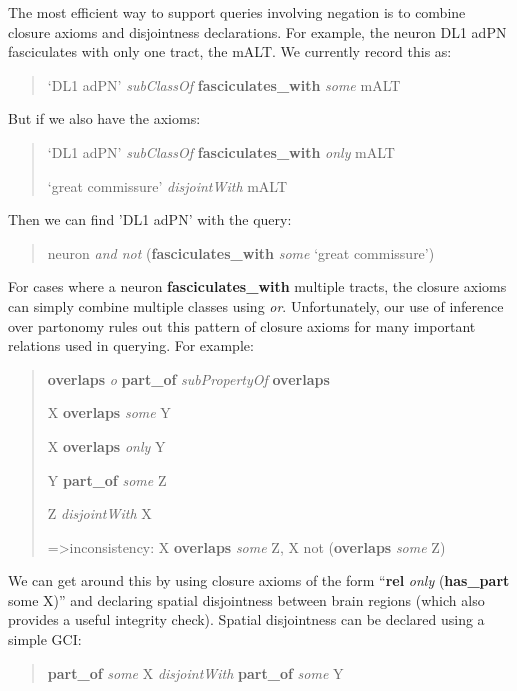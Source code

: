 \documentclass[runningheads,a4paper]{llncs}
\begin{document}
The most efficient way to support queries involving negation is to
combine closure axioms and disjointness declarations.  For
example, the neuron DL1 adPN fasciculates with only one tract, the
mALT.  We currently record this as:


\begin{quote}
`DL1 adPN' \textit{subClassOf} \textbf{fasciculates\_with} \textit{some} mALT
\end{quote}

But if we also have the axioms:

\begin{quote}
`DL1 adPN' \textit{subClassOf} \textbf{fasciculates\_with} \textit{only} mALT

`great commissure' \textit{disjointWith} mALT
\end{quote}

Then we can find 'DL1 adPN' with the query:
\begin{quote}
	neuron \textit{and not} (\textbf{fasciculates\_with} \textit{some} `great commissure')
\end{quote}

For cases where a neuron \textbf{fasciculates\_with} multiple tracts, the
closure axioms can simply combine multiple classes using
\textit{or}. Unfortunately, our use of inference over partonomy rules out
this pattern of closure axioms for many important relations used in querying.  For example:

\begin{quote}
\textbf{overlaps} \textit{o} \textbf{part\_of} \textit{subPropertyOf}
\textbf{overlaps}

X \textbf{overlaps} \textit{some} Y

X \textbf{overlaps} \textit{only} Y

Y \textbf{part\_of} \textit{some} Z

Z \textit{disjointWith} X

=\textgreater inconsistency: X \textbf{overlaps} \textit{some} Z, X not (\textbf{overlaps}
\textit{some} Z)
\end{quote}


We can get around this by using closure axioms of the form
``\textbf{rel} \textit{only} (\textbf{has\_part} some X)'' and declaring spatial
disjointness between brain regions (which also provides a useful
integrity check). Spatial disjointness can be declared using a simple
GCI:

\begin{quote}
\textbf{part\_of} \textit{some} X \textit{disjointWith} \textbf{part\_of} \textit{some} Y
\end{quote}
\end{document}
